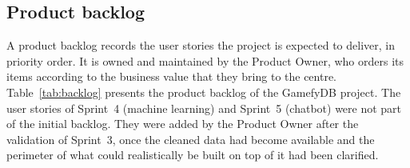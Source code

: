 \documentclass[12pt, a4paper]{report}
\begin{document}
\subsection{Product backlog}

A product backlog records the user stories the project is expected to
deliver, in priority order. It is owned and maintained by the Product
Owner, who orders its items according to the business value that they bring
to the centre. Table~\ref{tab:backlog} presents the product backlog of the
GamefyDB project. The user stories of Sprint~4 (machine learning) and
Sprint~5 (chatbot) were not part of the initial backlog. They were added by
the Product Owner after the validation of Sprint~3, once the cleaned data
had become available and the perimeter of what could realistically be built
on top of it had been clarified.
\end{document}
